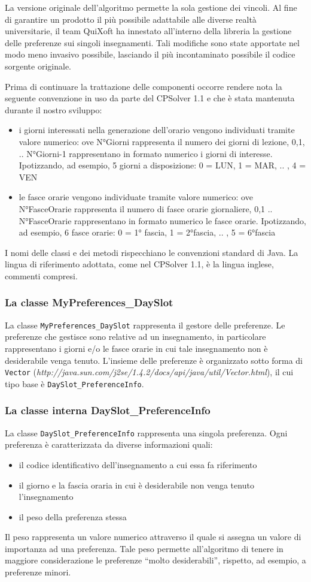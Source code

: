 \documentclass[11pt,a4paper]{article}
\begin{document}
La versione originale dell'algoritmo permette la sola gestione dei vincoli. Al fine di garantire un prodotto il più possibile adattabile alle diverse realtà universitarie, il team QuiXoft ha innestato all'interno della libreria la gestione delle preferenze sui singoli insegnamenti. Tali modifiche sono state apportate nel modo meno invasivo possibile, lasciando il più incontaminato possibile il codice sorgente originale.

Prima di continuare la trattazione delle componenti occorre rendere nota la seguente convenzione in uso da parte del CPSolver 1.1 e che è stata mantenuta durante il nostro sviluppo:
\begin{itemize}
 \item i giorni interessati nella generazione dell'orario vengono individuati tramite valore numerico: ove N°Giorni rappresenta il numero dei giorni di lezione, 0,1, .. N°Giorni-1 rappresentano in formato numerico i giorni di interesse. Ipotizzando, ad esempio, 5 giorni a disposizione: 0 = LUN, 1 = MAR, .. , 4 = VEN
 \item le fasce orarie vengono individuate tramite valore numerico: ove N°FasceOrarie rappresenta il numero di fasce orarie giornaliere, 0,1 .. N°FasceOrarie rappresentano in formato numerico le fasce orarie. Ipotizzando, ad esempio, 6 fasce orarie: 0 = 1° fascia, 1 = 2°fascia, .. , 5 = 6°fascia
\end{itemize}
I nomi delle classi e dei metodi rispecchiano le convenzioni standard di Java. La lingua di riferimento adottata, come nel CPSolver 1.1,  è la lingua inglese, commenti compresi.
\subsubsection*{La classe MyPreferences\_DaySlot}
La classe \verb|MyPreferences_DaySlot| rappresenta il gestore delle preferenze. Le preferenze che gestisce sono relative ad un insegnamento, in particolare rappresentano i giorni e/o le fasce orarie in cui tale insegnamento non è desiderabile venga tenuto. 
L'insieme delle preferenze è organizzato sotto forma di \verb|Vector| (\textit{http://java.sun.com/j2se/1.4.2/docs/api/java/util/Vector.html}), il cui tipo base è \verb|DaySlot_PreferenceInfo|.
\subsubsection*{La classe interna DaySlot\_PreferenceInfo}
La classe \verb|DaySlot_PreferenceInfo| rappresenta una singola preferenza. Ogni preferenza è caratterizzata da diverse informazioni quali:
\begin{itemize}
\item	il codice identificativo dell'insegnamento a cui essa fa riferimento
\item	il giorno e la fascia oraria in cui è desiderabile non venga tenuto l'insegnamento
\item	il peso della preferenza stessa
\end{itemize}
Il peso rappresenta un valore numerico attraverso il quale si assegna un valore di importanza ad una preferenza. Tale peso permette all'algoritmo di tenere in maggiore considerazione le preferenze ``molto desiderabili'', rispetto, ad esempio, a preferenze minori.
\end{document}
